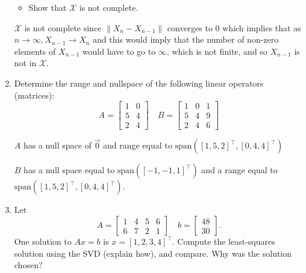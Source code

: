 \documentclass{article}
\begin{document}
\begin{enumerate}
\begin{itemize}
\item
Show that $\mathcal X$ is not complete.
\end{itemize}

\color{blue}

$\mathcal X$ is not complete since $\|X_n - X_{n-1}\|$ converges to 0 which implies that as $n \to \infty, X_{n-1} \to X_n$ and this would imply that the number of non-zero elements of $X_{n-1}$ would have to go to $\infty$, which is not finite, and so $X_{n-1}$ is not in $\mathcal X$. 
\color{black}



\item
Determine the range and nullspace of the following linear operators (matrices):
$$A=
\begin{bmatrix}
1 & 0 \\
5 & 4 \\
2 & 4
\end{bmatrix}
\quad
B=
\begin{bmatrix}
1 & 0 & 1 \\
5 & 4 & 9 \\
2 & 4 & 6
\end{bmatrix}
$$

\color{blue}
$A$ has a null space of $\vec{0}$ and range equal to $\text{span}([1,5,2]^\top, [0,4,4]^\top)$

$B$ has a null space equal to $\text{span}([-1,-1,1]^\top)$ and a range equal to $\text{span}([1,5,2]^\top, [0,4,4]^\top)$.
\color{black}


\item
Let 
$$A=\begin{bmatrix}
1 & 4 & 5 & 6 \\
6 & 7 & 2 & 1
\end{bmatrix}
\quad
b=\begin{bmatrix}
48\\
30
\end{bmatrix}.$$
One solution to $Ax=b$ is $x=[1,2,3,4]^\top$.  Compute the least-squares solution using the SVD (explain how), and compare. Why was the solution chosen?


\end{enumerate}
\end{document}
